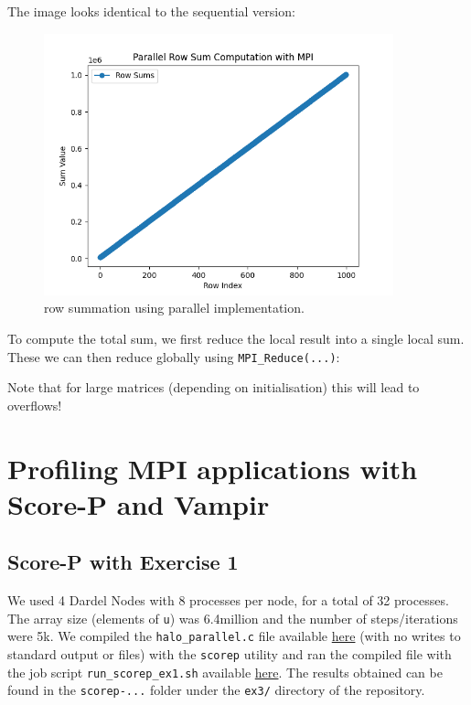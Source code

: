 \documentclass[a4paper,10pt]{article}
\begin{document}
The image looks identical to the sequential version:
\begin{figure}[H]
  \centering
  \includegraphics[width=0.9\textwidth]{img/ex2_para}
  \caption{row summation using parallel implementation.}
  \label{fig:ex2_seq}
\end{figure}

To compute the total sum, we first reduce the local result into a single local sum.
These we can then reduce globally using \verb|MPI_Reduce(...)|:

Note that for large matrices (depending on initialisation) this will lead to overflows!


\section{Profiling MPI applications with Score-P and Vampir}

\subsection{Score-P with Exercise 1}
We used 4 Dardel Nodes with 8 processes per node, for a total of 32 processes. The array size (elements of \verb|u|) was 6.4million and the number of steps/iterations were 5k. We compiled the \verb|halo_parallel.c| file available \href{https://github.com/paulmyr/DD2356-MethodsHPC/blob/master/4_mpi/ex3/halo_parallel.c}{here} (with no writes to standard output or files) with the \verb|scorep| utility and ran the compiled file with the job script \verb|run_scorep_ex1.sh| available \href{https://github.com/paulmyr/DD2356-MethodsHPC/blob/master/4_mpi/ex3/run_scorep_ex1.sh}{here}. The results obtained can be found in the \verb|scorep-...| folder under the \verb|ex3/| directory of the repository. 
\end{document}
